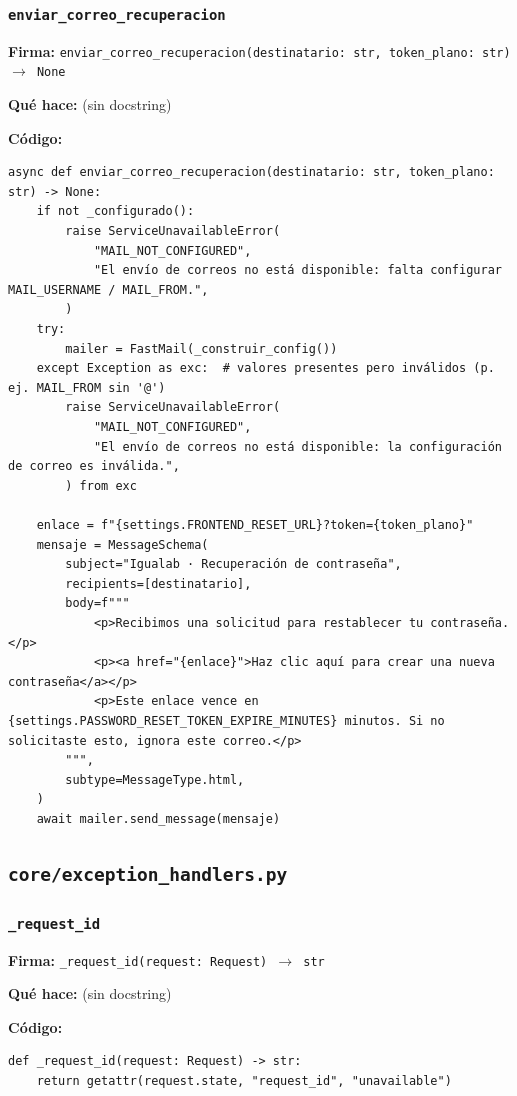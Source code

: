 \documentclass[11pt,a4paper]{article}
\begin{document}
\subsubsection*{\texttt{enviar\_correo\_recuperacion}}
\textbf{Firma:} \texttt{enviar\_correo\_recuperacion(destinatario: str, token\_plano: str) $\rightarrow$ None}

\textbf{Qué hace:} (sin docstring)

\textbf{Código:}
\begin{lstlisting}
async def enviar_correo_recuperacion(destinatario: str, token_plano: str) -> None:
    if not _configurado():
        raise ServiceUnavailableError(
            "MAIL_NOT_CONFIGURED",
            "El envío de correos no está disponible: falta configurar MAIL_USERNAME / MAIL_FROM.",
        )
    try:
        mailer = FastMail(_construir_config())
    except Exception as exc:  # valores presentes pero inválidos (p. ej. MAIL_FROM sin '@')
        raise ServiceUnavailableError(
            "MAIL_NOT_CONFIGURED",
            "El envío de correos no está disponible: la configuración de correo es inválida.",
        ) from exc

    enlace = f"{settings.FRONTEND_RESET_URL}?token={token_plano}"
    mensaje = MessageSchema(
        subject="Igualab · Recuperación de contraseña",
        recipients=[destinatario],
        body=f"""
            <p>Recibimos una solicitud para restablecer tu contraseña.</p>
            <p><a href="{enlace}">Haz clic aquí para crear una nueva contraseña</a></p>
            <p>Este enlace vence en {settings.PASSWORD_RESET_TOKEN_EXPIRE_MINUTES} minutos. Si no solicitaste esto, ignora este correo.</p>
        """,
        subtype=MessageType.html,
    )
    await mailer.send_message(mensaje)
\end{lstlisting}

\subsection{\texttt{core/exception\_handlers.py}}

\subsubsection*{\texttt{\_request\_id}}
\textbf{Firma:} \texttt{\_request\_id(request: Request) $\rightarrow$ str}

\textbf{Qué hace:} (sin docstring)

\textbf{Código:}
\begin{lstlisting}
def _request_id(request: Request) -> str:
    return getattr(request.state, "request_id", "unavailable")
\end{lstlisting}
\end{document}
